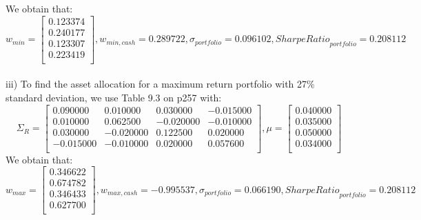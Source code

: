 \documentclass{article}
\begin{document}
We obtain that:
\begin{equation*}
w_{min} =%
\begin{bmatrix}{}
 0.123374 \\ 
  0.240177 \\ 
  0.123307 \\ 
  0.223419 \\ 
  \end{bmatrix},
w_{min,cash} = 0.289722,
\sigma_{portfolio} = 0.096102,
{Sharpe Ratio}_{portfolio} = 0.208112
\end{equation*}
\vspace{5mm} \\
iii) To find the asset allocation for a maximum return portfolio with 27\% standard deviation, we use Table 9.3 on p257 with:
\begin{equation*}
\Sigma_{R}=%
\begin{bmatrix}{}
 0.090000 & 0.010000 & 0.030000 & -0.015000 \\ 
  0.010000 & 0.062500 & -0.020000 & -0.010000 \\ 
  0.030000 & -0.020000 & 0.122500 & 0.020000 \\ 
  -0.015000 & -0.010000 & 0.020000 & 0.057600 \\ 
  \end{bmatrix},
\mu = \begin{bmatrix}{}
 0.040000 \\ 
  0.035000 \\ 
  0.050000 \\ 
  0.034000 \\ 
  \end{bmatrix}
\end{equation*}
We obtain that:
\begin{equation*}
w_{max} =%
\begin{bmatrix}{}
 0.346622 \\ 
  0.674782 \\ 
  0.346433 \\ 
  0.627700 \\ 
  \end{bmatrix},
w_{max,cash} = -0.995537,
\sigma_{portfolio} = 0.066190,
{Sharpe Ratio}_{portfolio} = 0.208112
\end{equation*}
\vspace{5mm} \\
\end{document}
